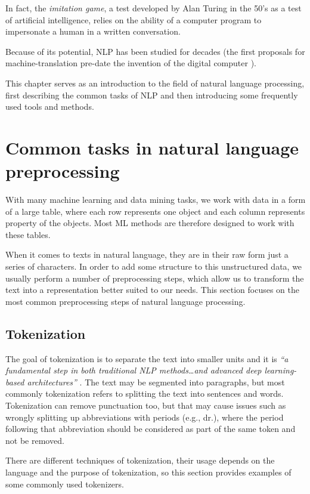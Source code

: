 In fact, the \textit{imitation game}, a test developed by Alan Turing in the 50's as a test of artificial intelligence, relies on the ability of a computer program to impersonate a human in a written conversation. \cite{turing}


Because of its potential, NLP has been studied for decades (the first proposals for machine-translation pre-date the invention of the digital computer \cite{nlp_history}). 

This chapter serves as an introduction to the field of natural language processing, first describing the common tasks of NLP and then introducing some frequently used tools and methods.
\section{Common tasks in natural language preprocessing}
With many machine learning and data mining tasks, we work with data in a form of a large table, where each row represents one object and each column represents property of the objects. Most ML methods are therefore designed to work with these tables. 

When it comes to texts in natural language, they are in their raw form just a series of characters. In order to add some structure to this unstructured data, we usually perform a number of preprocessing steps, which allow us to transform the text into a representation better suited to our needs. This section focuses on the most common preprocessing steps of natural language processing.

\subsection{Tokenization}
The goal of tokenization is to separate the text into smaller units and it is \textit{``a fundamental step in both traditional NLP methods\ldots and advanced deep learning-based architectures''} \cite{tokenization}.
The text may be segmented into paragraphs, but most commonly tokenization refers to splitting the text into sentences and words. 
Tokenization can remove punctuation too, but that may cause issues such as wrongly splitting up abbreviations with periods (e.g., dr.), where the period following that abbreviation should be considered as part of the same token and not be removed. \cite{nlp_tasks}

There are different techniques of tokenization, their usage depends on the language and the purpose of tokenization, so this section provides examples of some commonly used tokenizers.
